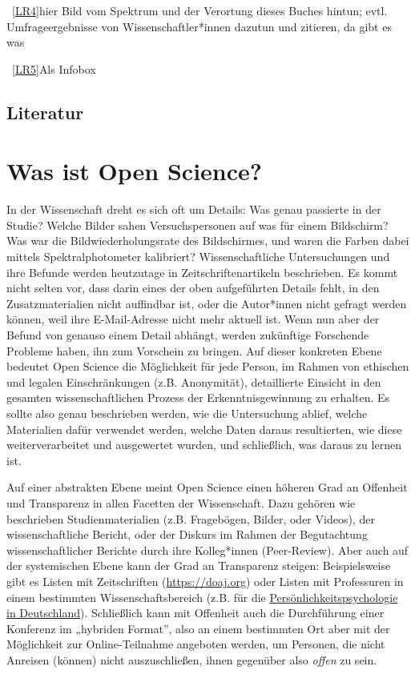 \documentclass[
  letterpaper,
  DIV=11,
  numbers=noendperiod]{scrreprt}
\begin{document}
~\hyperref[_msoanchor_4]{{[}LR4{]}}hier Bild vom Spektrum und der
Verortung dieses Buches hintun; evtl. Umfrageergebnisse von
Wissenschaftler*innen dazutun und zitieren, da gibt es was

~\hyperref[_msoanchor_5]{{[}LR5{]}}Als Infobox

\section*{Literatur}\label{literatur-1}


\chapter{Was ist Open Science?}\label{was-ist-open-science}

In der Wissenschaft dreht es sich oft um Details: Was genau passierte in
der Studie? Welche Bilder sahen Versuchspersonen auf was für einem
Bildschirm? Was war die Bildwiederholungsrate des Bildschirmes, und
waren die Farben dabei mittels Spektralphotometer kalibriert?
Wissenschaftliche Untersuchungen und ihre Befunde werden heutzutage in
Zeitschriftenartikeln beschrieben. Es kommt nicht selten vor, dass darin
eines der oben aufgeführten Details fehlt, in den Zusatzmaterialien
nicht auffindbar ist, oder die Autor*innen nicht gefragt werden können,
weil ihre E-Mail-Adresse nicht mehr aktuell ist. Wenn nun aber der
Befund von genauso einem Detail abhängt, werden zukünftige Forschende
Probleme haben, ihn zum Vorschein zu bringen. Auf dieser konkreten Ebene
bedeutet Open Science die Möglichkeit für jede Person, im Rahmen von
ethischen und legalen Einschränkungen (z.B. Anonymität), detaillierte
Einsicht in den gesamten wissenschaftlichen Prozess der
Erkenntnisgewinnung zu erhalten. Es sollte also genau beschrieben
werden, wie die Untersuchung ablief, welche Materialien dafür verwendet
werden, welche Daten daraus resultierten, wie diese weiterverarbeitet
und ausgewertet wurden, und schließlich, was daraus zu lernen ist.

Auf einer abstrakten Ebene meint Open Science einen höheren Grad an
Offenheit und Transparenz in allen Facetten der Wissenschaft. Dazu
gehören wie beschrieben Studienmaterialien (z.B. Fragebögen, Bilder,
oder Videos), der wissenschaftliche Bericht, oder der Diskurs im Rahmen
der Begutachtung wissenschaftlicher Berichte durch ihre Kolleg*innen
(Peer-Review). Aber auch auf der systemischen Ebene kann der Grad an
Transparenz steigen: Beispielsweise gibt es Listen mit Zeitschriften
(\url{https://doaj.org}) oder Listen mit Professuren in einem bestimmten
Wissenschaftsbereich (z.B. für die
\href{https://docs.google.com/spreadsheets/d/1XwO4n88zkdH1bDGpW6Uz8f4sH24P5FG0ihUp7i0Y-gY/edit\#gid=1684024252}{Persönlichkeitspsychologie
in Deutschland}). Schließlich kann mit Offenheit auch die Durchführung
einer Konferenz im „hybriden Format'', also an einem bestimmten Ort aber
mit der Möglichkeit zur Online-Teilnahme angeboten werden, um Personen,
die nicht Anreisen (können) nicht auszuschließen, ihnen gegenüber also
\emph{offen} zu sein.
\end{document}

